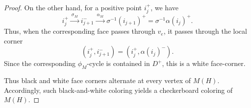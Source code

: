 \documentclass[10pt,a4paper]{amsart}
\begin{document}
\begin{proof}
On the other hand, for a positive point \(i_j^+\), we have
\[
        i_j^+
        \xrightarrow{\ \sigma_M\ }
        i_{j+1}^-
        \xrightarrow{\ \alpha_M\ }
        \sigma^{-1}(i_{j+1})^+
        =
        \sigma^{-1}\alpha(i_j)^+ .
\]
Thus, when the corresponding face passes through \(v_e\), it passes
through the local corner
\[
        (i_j^+,i_{j+1}^-)
        =
        (i_j^+,\alpha(i_j)^-).
\]
Since the corresponding \(\phi_M\)-cycle is contained in \(D^+\), this is
a white face-corner. 

Thus black and white face corners alternate at every vertex of \(M(H)\). Accordingly, such black-and-white coloring yields a checkerboard coloring of \(M(H)\).
\end{proof}
\end{document}
